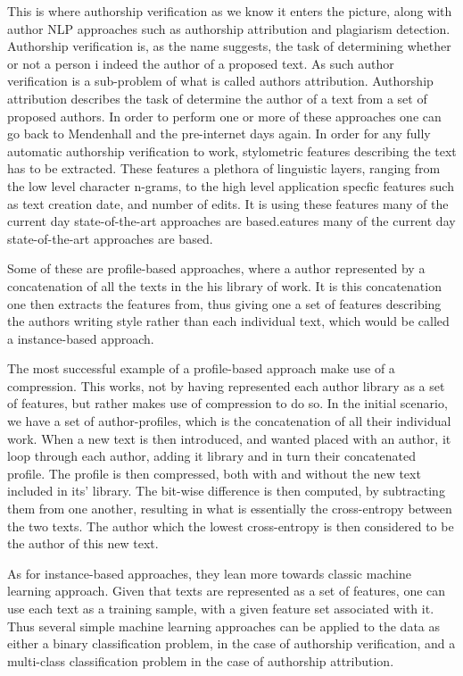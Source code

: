 This is where authorship verification as we know it enters the picture, along
with author \gls{NLP} approaches such as authorship attribution and plagiarism
detection. Authorship verification is, as the name suggests, the task of
determining whether or not a person i indeed the author of a proposed text. As
such author verification is a sub-problem of what is called authors attribution.
Authorship attribution describes the task of determine the author of a text
from a set of proposed authors. In order to perform one or more of these
approaches one can go back to Mendenhall and the pre-internet days again. In
order for any fully automatic authorship verification to work, stylometric
features describing the text has to be extracted. These features a plethora of
linguistic layers, ranging from the low level character n-grams, to the high
level application specfic features such as text creation date, and number of
edits. It is using these features many of the current day state-of-the-art
approaches are based.eatures many of the current day state-of-the-art approaches
are based.

Some of these are profile-based approaches, where a author represented by
a concatenation of all the texts in the his library of work. It is this
concatenation one then extracts the features from, thus giving one a set of
features describing the authors writing style rather than each individual text,
which would be called a instance-based approach.

The most successful example of a profile-based approach make use of a
compression. This works, not by having represented each author library as a
set of features, but rather makes use of compression to do so. In the initial
scenario, we have a set of author-profiles, which is the concatenation of all
their individual work. When a new text is then introduced, and wanted placed
with an author, it loop through each author, adding it library and in turn their
concatenated profile. The profile is then compressed, both with and without the
new text included in its' library. The bit-wise difference is then computed,
by subtracting them from one another, resulting in what is essentially the
cross-entropy between the two texts. The author which the lowest cross-entropy
is then considered to be the author of this new text.

As for instance-based approaches, they lean more towards classic machine
learning approach. Given that texts are represented as a set of features, one
can use each text as a training sample, with a given feature set associated with it.
Thus several simple machine learning approaches can be applied to the data as either
a binary classification problem, in the case of authorship verification, and a 
multi-class classification problem in the case of authorship attribution.

